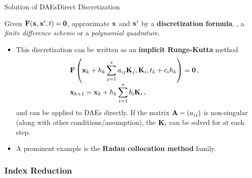 \begin{frame}{Solution of \aclp{DAE}}{Direct Discretization}
  \begin{bbox}
    Given $\mathbf{F}(\mathbf{x}, \mathbf{x}^\prime, t) = \mathbf{0}$, approximate $\mathbf{x}$ and $\mathbf{x}^\prime$ by a \textbf{discretization formula}, \eg{}, a \emph{finite difference scheme} or a \emph{polynomial quadrature}.
  \end{bbox}
  \begin{itemize}
    \item This discretization can be written as an \textbf{implicit Runge-Kutta} method
    \begin{equation*}
      \begin{array}{l}
        \mathbf{F}\left(\mathbf{x}_{k} + h_k\displaystyle\sum_{j=1}^{s}a_{ij} \mathbf{K}_j, \mathbf{K}_i, t_{k} + c_i h_k\right) = \mathbf{0} \, \text{,} \\[1em]
        \mathbf{x}_{k+1} = \mathbf{x}_{k} + h_k\displaystyle\sum_{i=1}^{s} b_i \mathbf{K}_i \, \text{,}
      \end{array}
    \end{equation*}
    and can be applied to \acp{DAE} directly. If the matrix $\mathbf{A} = (a_{ij})$ is non-singular (along with other conditions/assumption), the $\mathbf{K}_i$ can be solved for at each step.
    \item A prominent example is the \textbf{Radau collocation method} family.
  \end{itemize}
\end{frame}

\subsubsection{Index Reduction}

